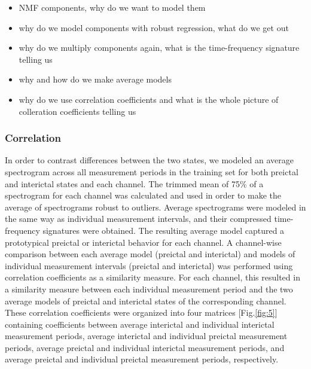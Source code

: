 \documentclass{article}
\begin{document}
\begin{itemize}
\item NMF components, why do we want to model them

\item why do we model components with robust regression, what do we get out

\item why do we multiply components again, what is the time-frequency signature telling us

\item why and how do we make average models

\item why do we use correlation coefficients and what is the whole picture of colleration coefficients telling us
\end{itemize}



\subsubsection{Correlation}

In order to contrast differences between the two states, we modeled an average spectrogram across all measurement periods in the training set for both preictal and interictal states and each channel. The trimmed mean of 75\% of a spectrogram for each channel was calculated and used in order to make the average of spectrograms robust to outliers. Average spectrograms were modeled in the same way as individual measurement intervals, and their compressed time-frequency signatures were obtained. The resulting average model captured a prototypical preictal or interictal behavior for each channel. A channel-wise comparison between each average model (preictal and interictal) and models of individual measurement intervals (preictal and interictal) was performed using correlation coefficients as a similarity measure. For each channel, this resulted in a similarity measure between each individual measurement period and the two average models of preictal and interictal states of the corresponding channel. These correlation coefficients were organized into four matrices [Fig.\ref{fig:5}] containing coefficients between average interictal and individual interictal measurement periods, average interictal and individual preictal measurement periods, average preictal and individual interictal measurement periods, and average preictal and individual preictal measurement periods, respectively. 
\end{document}

